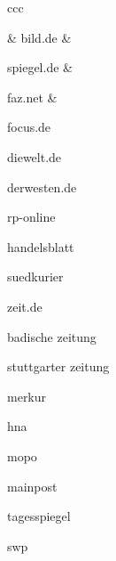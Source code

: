 \begin{landscape} \small
\begin{tabular}{ccc}

\hline
		&
		bild.de &

		spiegel.de &

		faz.net &

		focus.de 

		diewelt.de 

		derwesten.de

		rp-online

		handelsblatt

		suedkurier

		zeit.de

		badische zeitung

		stuttgarter zeitung

		merkur

		hna

		mopo

		mainpost

		tagesspiegel

		swp

		\\ \hline


\end{tabular}
\end{landscape}

